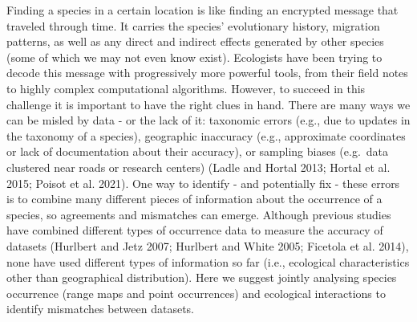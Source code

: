 \documentclass[10pt,oneside]{article}
\begin{document}
Finding a species in a certain location is like finding an encrypted
message that traveled through time. It carries the species' evolutionary
history, migration patterns, as well as any direct and indirect effects
generated by other species (some of which we may not even know exist).
Ecologists have been trying to decode this message with progressively
more powerful tools, from their field notes to highly complex
computational algorithms. However, to succeed in this challenge it is
important to have the right clues in hand. There are many ways we can be
misled by data - or the lack of it: taxonomic errors (e.g., due to
updates in the taxonomy of a species), geographic inaccuracy (e.g.,
approximate coordinates or lack of documentation about their accuracy),
or sampling biases (e.g.~data clustered near roads or research centers)
(Ladle and Hortal 2013; Hortal et al. 2015; Poisot et al. 2021). One way
to identify - and potentially fix - these errors is to combine many
different pieces of information about the occurrence of a species, so
agreements and mismatches can emerge. Although previous studies have
combined different types of occurrence data to measure the accuracy of
datasets (Hurlbert and Jetz 2007; Hurlbert and White 2005; Ficetola et
al. 2014), none have used different types of information so far (i.e.,
ecological characteristics other than geographical distribution). Here
we suggest jointly analysing species occurrence (range maps and point
occurrences) and ecological interactions to identify mismatches between
datasets.
\end{document}
